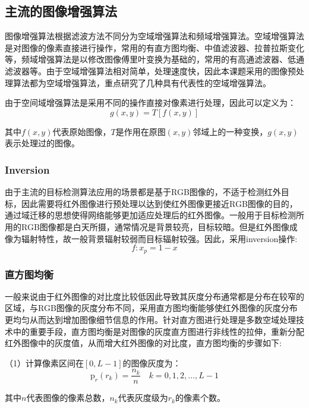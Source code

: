 \subsection{主流的图像增强算法}
图像增强算法根据滤波方法不同分为空域增强算法和频域增强算法。空域增强算法是对图像的像素直接进行操作，常用的有直方图均衡、中值滤波器、拉普拉斯变化等，频域增强算法是以修改图像傅里叶变换为基础的，常用的有高通滤波器、低通滤波器等。由于空域增强算法相对简单，处理速度快，因此本课题采用的图像预处理算法都为空域增强算法，重点研究了几种具有代表性的空域增强算法。

由于空间域增强算法是采用不同的操作直接对像素进行处理，因此可以定义为：
\begin{equation}
  g(x, y)=T[f(x, y)]
\end{equation}

其中$f(x, y)$代表原始图像，$T$是作用在原图$(x, y)$邻域上的一种变换，$g(x, y)$表示处理过的图像。

\subsubsection{Inversion}
由于主流的目标检测算法应用的场景都是基于RGB图像的，不适于检测红外目标，因此需要将红外图像进行预处理以达到使红外图像更接近RGB图像的目的，通过域迁移的思想使得网络能够更加适应处理后的红外图像。一般用于目标检测所用的RGB图像都是白天所摄，通常情况是背景较亮，目标较暗。但是红外图像成像为辐射特性，故一般背景辐射较弱而目标辐射较强。因此，采用inversion操作:
\begin{equation}
  f: x_{p}=1-x
\end{equation}

\subsubsection{直方图均衡}
一般来说由于红外图像的对比度比较低因此导致其灰度分布通常都是分布在较窄的区域，与RGB图像的灰度分布不同，采用直方图均衡能够使红外图像的灰度分布更均匀从而达到增加图像细节信息的作用。针对直方图进行处理是多数空域处理技术中的重要手段，直方图均衡是对图像的灰度直方图进行非线性的拉伸，重新分配红外图像中的灰度值，从而增大红外图像的对比度，直方图均衡的步骤如下: 

（1）计算像素区间在$[0,L-1]$的图像灰度为：
\begin{equation}
  \mathrm{p}_{r}\left(r_{k}\right)=\frac{n_{k}}{n} \quad k=0,1,2, \ldots, L-1
\end{equation}

其中$n$代表图像的像素总数，$n_{k}$代表灰度级为$r_{k}$的像素个数。

